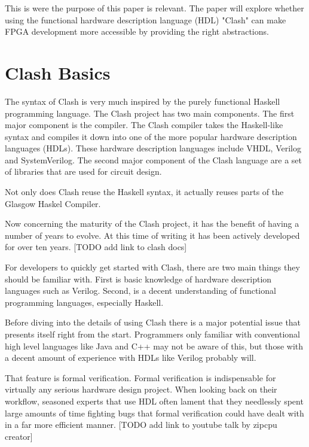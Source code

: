 \documentclass{article}
\begin{document}
    This is were the purpose of this paper is relevant. The paper will explore whether using the
    functional hardware description language (HDL) "Clash" can make FPGA development more accessible by providing
    the right abstractions.    
    
    \section{Clash Basics}

    The syntax of Clash is very much inspired by the purely functional Haskell programming language.
    The Clash project has two main components. The first major component is the compiler.
    The Clash compiler takes the Haskell-like syntax and compiles it down
    into one of the more popular hardware description languages (HDLs).
    These hardware description languages include VHDL, Verilog and SystemVerilog.
    The second major component of the Clash language are a set of libraries that
    are used for circuit design.

    Not only does Clash reuse the Haskell syntax, it actually reuses parts of the
    Glasgow Haskel Compiler.

    Now concerning the maturity of the Clash project, it has the benefit of having
    a number of years to evolve. At this time of writing it has been actively
    developed for over ten years. [TODO add link to clash docs]

    For developers to quickly get started with Clash, there are two main things they
    should be familiar with. First is basic knowledge of hardware description languages
    such as Verilog. Second, is a decent understanding of functional programming
    languages, especially Haskell.

    Before diving into the details of using Clash there is a major potential issue
    that presents itself right from the start. Programmers only familiar with
    conventional high level languages like Java and C++ may not be aware of this,
    but those with a decent amount of experience with HDLs like Verilog probably will.

    That feature is formal verification. Formal verification is indispensable for
    virtually any serious hardware design project. When looking back on their workflow,
    seasoned experts that use HDL often lament that they needlessly spent
    large amounts of time fighting bugs that formal verification could have dealt with in
    a far more efficient manner. [TODO add link to youtube talk by zipcpu creator]
\end{document}
